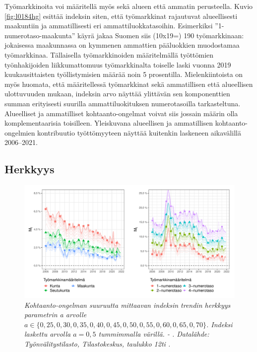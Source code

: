 \documentclass[12pt]{article}
\newcommand{\lastdatamonth}{\unskip}
\newcommand{\firstdatamonth}{\unskip}
\newcommand{\newcaption}[1]{\caption{\textit{\footnotesize{#1}}}}
\begin{document}
Työmarkkinoita voi määritellä myös sekä alueen että ammatin perusteella. Kuvio \ref{fig:l0184hg} esittää indeksin siten, että työmarkkinat rajautuvat alueellisesti maakuntiin ja ammatillisesti eri ammattiluokkatasoihin. Esimerkiksi ”1-numerotaso-maakunta” käyrä jakaa Suomen siis (10x19=) 190 työmarkkinaan: jokaisessa maakunnassa on kymmenen ammattien pääluokkien muodostamaa työmarkkinaa. Tällaisella työmarkkinoiden määritelmällä työttömien työnhakijoiden liikkumattomuus työmarkkinalta toiselle laski vuonna 2019 kuukausittaisten työllistymisien määrää noin 5 prosentilla. Mielenkiintoista on myös huomata, että määritellessä työmarkkinat sekä ammatillisen että alueellisen ulottuvuuden mukaan, indeksin arvo näyttää ylittävän sen komponenttien summan erityisesti suurilla ammattiluokituksen numerotasoilla tarkasteltuna. Alueelliset ja ammatilliset kohtaanto-ongelmat voivat siis jossain määrin olla komplementaarisia toisilleen. Yleiskuvana alueellisen ja ammatillisen kohtaanto-ongelmien kontribuutio työttömyyteen näyttää kuitenkin laskeneen aikavälillä 2006–2021.

\subsection{Herkkyys} \label{section:herkkyys}
\begin{figure}
\centering
\includegraphics[scale = 0.55]{../kuviot/herkkyys_a.pdf}
    \newcaption{Kohtaanto-ongelman suuruutta mittaavan indeksin trendin herkkyys parametrin a arvolle $a \in \{0,25, 0,30, 0,35, 0,40, 0,45, 0,50, 0,55, 0,60, 0,65, 0,70\}$. Indeksi laskettu arvolla $a = 0,5$ tummimmalla värillä. \protect \firstdatamonth \phantom{} - \protect\lastdatamonth. Datalähde: Työnvälitystilasto, Tilastokeskus, taulukko 12ti \protect \cite{svt2011}.}
   \label{fig:ldsdfhg}
\end{figure}
\end{document}
